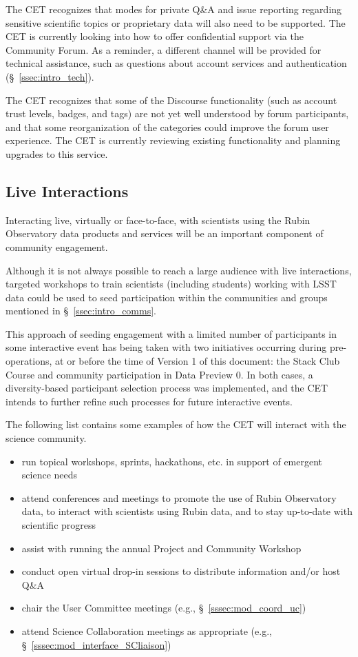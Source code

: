 \documentclass[DM,lsstdraft,toc]{lsstdoc}
\begin{document}
The CET recognizes that modes for private Q\&A and issue reporting regarding sensitive scientific topics or proprietary data will also need to be supported.
The CET is currently looking into how to offer confidential support via the Community Forum.
As a reminder, a different channel will be provided for technical assistance, such as questions about account services and authentication (\S~\ref{ssec:intro_tech}).

The CET recognizes that some of the Discourse functionality (such as account trust levels, badges, and tags) are not yet well understood by forum participants, and that some reorganization of the categories could improve the forum user experience.
The CET is currently reviewing existing functionality and planning upgrades to this service.


\subsection{Live Interactions}\label{ssec:mod_interact}

Interacting live, virtually or face-to-face, with scientists using the Rubin Observatory data products and services will be an important component of community engagement.

Although it is not always possible to reach a large audience with live interactions, targeted workshops to train scientists (including students) working with LSST data could be used to seed participation within the communities and groups mentioned in \S~\ref{ssec:intro_comms}.

This approach of seeding engagement with a limited number of participants in some interactive event has being taken with two initiatives occurring during pre-operations, at or before the time of Version 1 of this document: the Stack Club Course and community participation in Data Preview 0.
In both cases, a diversity-based participant selection process was implemented, and the CET intends to further refine such processes for future interactive events. 

The following list contains some examples of how the CET will interact with the science community.
\begin{itemize}
\item run topical workshops, sprints, hackathons, etc. in support of emergent science needs
\item attend conferences and meetings to promote the use of Rubin Observatory data, to interact with scientists using Rubin data, and to stay up-to-date with scientific progress
\item assist with running the annual Project and Community Workshop
\item conduct open virtual drop-in sessions to distribute information and/or host Q\&A 
\item chair the User Committee meetings (e.g., \S~\ref{sssec:mod_coord_uc})
\item attend Science Collaboration meetings as appropriate (e.g., \S~\ref{sssec:mod_interface_SCliaison})
\end{itemize}
\end{document}
